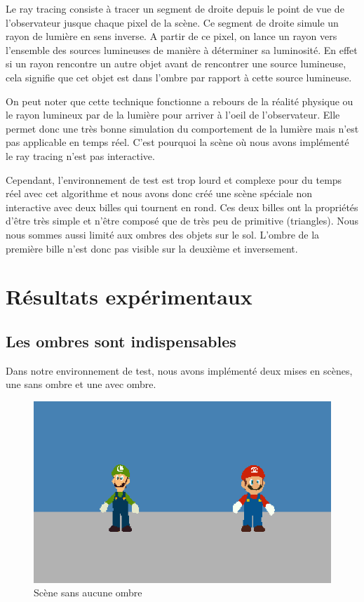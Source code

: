 \documentclass[a4paper,10pt]{report}
\begin{document}
Le ray tracing consiste à tracer un segment de droite depuis le point de vue de l'observateur jusque chaque pixel de la scène. Ce segment de droite simule un rayon de lumière en sens inverse. A partir de ce pixel, on lance un rayon vers l'ensemble des sources lumineuses de manière à déterminer sa luminosité. En effet si un rayon rencontre un autre objet avant de rencontrer une source lumineuse, cela signifie que cet objet est dans l'ombre par rapport à cette source lumineuse.

On peut noter que cette technique fonctionne a rebours de la réalité physique ou le rayon lumineux par de la lumière pour arriver à l'oeil de l'observateur. Elle permet donc une très bonne simulation du comportement de la lumière mais n'est pas applicable en temps réel. C'est pourquoi la scène où nous avons implémenté le ray tracing n'est pas interactive.

Cependant, l'environnement de test est trop lourd et complexe pour du temps réel avec cet algorithme et nous avons donc créé une scène spéciale non interactive avec deux billes qui tournent en rond. Ces deux billes ont la propriétés d'\^etre très simple et n'\^etre composé que de très peu de primitive (triangles).
Nous nous sommes aussi limité aux ombres des objets sur le sol. L'ombre de la première bille n'est donc pas visible sur la deuxième et inversement.


\chapter{Résultats expérimentaux}

\section{Les ombres sont indispensables}

Dans notre environnement de test, nous avons implémenté deux mises en scènes, une sans ombre et une avec ombre.

\begin{figure}[H]
\includegraphics[scale=0.5]{images/pasombre.png}
\centering
\caption{Scène sans aucune ombre}
\end{figure}
\end{document}
